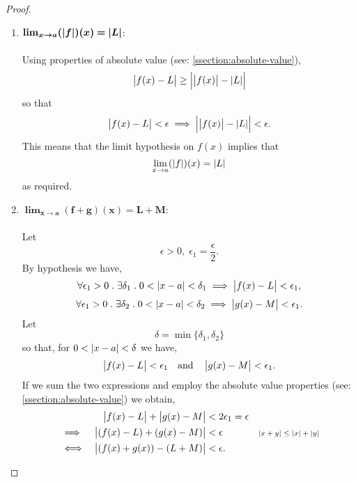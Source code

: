\documentclass[MathsNotesBase.tex]{subfiles}
\begin{document}
{\begin{proof}
\begin{enumerate}[label=(\roman*)]
{					Let 
					\[ \epsilon > 0,\; \epsilon_1 = \frac{\epsilon}{\abs{c}}.\]
					By hypothesis,
					\[ \forall \epsilon_1 > 0 \logicsep \exists \delta_1 \logicsep 0 < \abs{x - a} < \delta_1 \implies \abs{f(x) - L} < \epsilon_1. \]
					Furthermore,
					\begin{align*}
					&& \abs{f(x) - L} &< \epsilon_1 \\
					&\iff & \abs{c}\abs{f(x) - L} &< \abs{c}\epsilon_1 &\sidecomment{} \\
					&\iff & \abs{cf(x) - cL} &< \abs{c}\epsilon_1 = \abs{c}\frac{\epsilon}{\abs{c}} = \epsilon. &\sidecomment{by \autoref{prop:product-of-absolute-vals-is-absolute-val-of-product}}
					\end{align*}
					\bigskip
				}
				\item{${\bm{ \lim_{x \to a} (\left\lvert f\right\rvert)(x) = \left\lvert L\right\rvert }}$:\\\\
					Using properties of absolute value (see: \ref{ssection:absolute-value}), 
					\[ \left\lvert f(x) - L\right\rvert \geq \left\lvert\left\lvert f(x)\right\rvert - \left\lvert L\right\rvert\right\rvert \]
					so that
					\[ \left\lvert f(x) - L\right\rvert < \epsilon \implies \left\lvert\left\lvert f(x)\right\rvert - \left\lvert L\right\rvert\right\rvert < \epsilon. \]
					This means that the limit hypothesis on $f(x)$ implies that
					\[ \lim_{x \to a} (\left\lvert f\right\rvert)(x) = \left\lvert L\right\rvert \]
					as required.
					\bigskip
				}
				\item{${\bm{ \lim_{x \to a} (f + g)(x) = L + M }}$:\\\\
					Let 
					\[ \epsilon > 0,\; \epsilon_1 = \frac{\epsilon}{2}.\]
					By hypothesis we have,
					\[ \forall \epsilon_1 > 0 \;.\; \exists \delta_1 \;.\; 0 < \left\lvert x - a\right\rvert < \delta_1 \implies \left\lvert f(x) - L\right\rvert < \epsilon_1, \]
					\[ \forall \epsilon_1 > 0 \;.\; \exists \delta_2 \;.\; 0 < \left\lvert x - a\right\rvert < \delta_2 \implies \left\lvert g(x) - M\right\rvert < \epsilon_1. \]
					Let 
					\[ \delta = \min \{\delta_1,\delta_2\} \]
					so that, for ${ 0 < \left\lvert x - a\right\rvert < \delta }$ we have,
					\[  \left\lvert f(x) - L\right\rvert < \epsilon_1 \hspace{10pt}\text{and}\hspace{10pt} \left\lvert g(x) - M\right\rvert < \epsilon_1. \]
					If we sum the two expressions and employ the absolute value properties (see: \ref{ssection:absolute-value}) we obtain,
					\begin{align*}
					&& \abs{f(x) - L} + \abs{g(x) - M} &<  2\epsilon_1 = \epsilon \\
					&\implies & \abs{(f(x) - L) + (g(x) - M)} &<  \epsilon &\sidecomment{${ \abs{x + y} \leq \abs{x} + \abs{y} }$} \\
					&\iff & \abs{(f(x) + g(x)) - (L + M)} &<  \epsilon. &\sidecomment{}

\end{align*}}
\end{enumerate}
\end{proof}}
\end{document}
